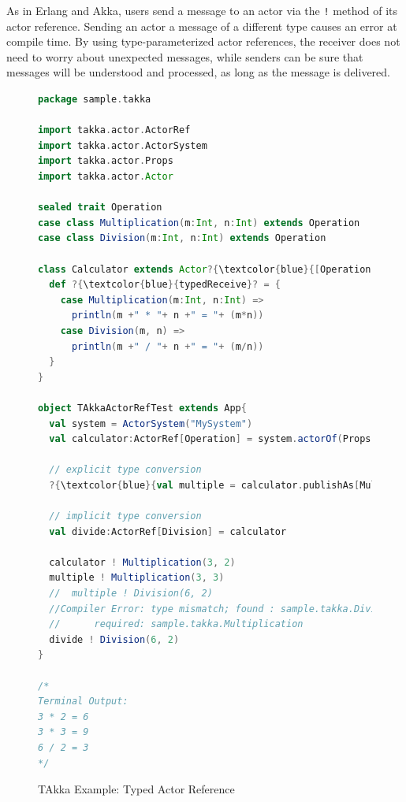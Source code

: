 As in Erlang and Akka, users send a message to an actor via the {\tt !} 
method of its actor reference.   Sending an actor a message of a different type 
causes an error at compile time.  By using type-parameterized actor references, 
the receiver does not need to worry about unexpected messages, while senders 
can be sure that messages will be understood and processed, as long as the 
message is delivered.







\begin{figure}[p]
\begin{lstlisting}[language=scala,  escapechar=?]
package sample.takka

import takka.actor.ActorRef
import takka.actor.ActorSystem
import takka.actor.Props
import takka.actor.Actor

sealed trait Operation
case class Multiplication(m:Int, n:Int) extends Operation
case class Division(m:Int, n:Int) extends Operation

class Calculator extends Actor?{\textcolor{blue}{[Operation]}? {
  def ?{\textcolor{blue}{typedReceive}? = {
    case Multiplication(m:Int, n:Int) =>
      println(m +" * "+ n +" = "+ (m*n))    
    case Division(m, n) =>
      println(m +" / "+ n +" = "+ (m/n))
  }
}

object TAkkaActorRefTest extends App{
  val system = ActorSystem("MySystem")
  val calculator:ActorRef[Operation] = system.actorOf(Props[?{\textcolor{blue}{Operation}?, Calculator], "calculator")
  
  // explicit type conversion 
  ?{\textcolor{blue}{val multiple = calculator.publishAs[Multiplication]}?

  // implicit type conversion 
  val divide:ActorRef[Division] = calculator  
  
  calculator ! Multiplication(3, 2)
  multiple ! Multiplication(3, 3)
  //  multiple ! Division(6, 2)  
  //Compiler Error: type mismatch; found : sample.takka.Division
  //	  required: sample.takka.Multiplication
  divide ! Division(6, 2)  
}

/*
Terminal Output:
3 * 2 = 6
3 * 3 = 9
6 / 2 = 3
*/
\end{lstlisting}
\caption{TAkka Example: Typed Actor Reference}
\label{takka_actor_reference_example}
\end{figure}


